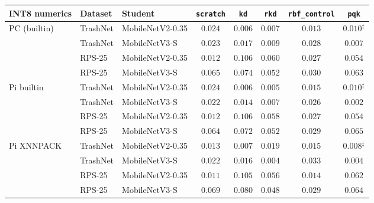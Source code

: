 \begin{tabular}{@{}lllccccc@{}}
\toprule
INT8 numerics & Dataset & Student & \texttt{scratch} & \texttt{kd} & \texttt{rkd} & \texttt{rbf\_control} & \texttt{pqk} \\
\midrule
PC (builtin) & TrashNet & MobileNetV2-0.35 & $0.024$ & $\mathbf{0.006}$ & $0.007$ & $0.013$ & $0.010$$^{\ddagger}$ \\
 & TrashNet & MobileNetV3-S & $0.023$ & $0.017$ & $0.009$ & $0.028$ & $\mathbf{0.007}$ \\
 & RPS-25 & MobileNetV2-0.35 & $\mathbf{0.012}$ & $0.106$ & $0.060$ & $0.027$ & $0.054$ \\
 & RPS-25 & MobileNetV3-S & $0.065$ & $0.074$ & $0.052$ & $\mathbf{0.030}$ & $0.063$ \\
\midrule
Pi builtin & TrashNet & MobileNetV2-0.35 & $0.024$ & $0.006$ & $\mathbf{0.005}$ & $0.015$ & $0.010$$^{\ddagger}$ \\
 & TrashNet & MobileNetV3-S & $0.022$ & $0.014$ & $0.007$ & $0.026$ & $\mathbf{0.002}$ \\
 & RPS-25 & MobileNetV2-0.35 & $\mathbf{0.012}$ & $0.106$ & $0.058$ & $0.027$ & $0.054$ \\
 & RPS-25 & MobileNetV3-S & $0.064$ & $0.072$ & $0.052$ & $\mathbf{0.029}$ & $0.065$ \\
\midrule
Pi XNNPACK & TrashNet & MobileNetV2-0.35 & $0.013$ & $\mathbf{0.007}$ & $0.019$ & $0.015$ & $0.008$$^{\ddagger}$ \\
 & TrashNet & MobileNetV3-S & $0.022$ & $0.016$ & $0.004$ & $0.033$ & $\mathbf{0.004}$ \\
 & RPS-25 & MobileNetV2-0.35 & $\mathbf{0.011}$ & $0.105$ & $0.056$ & $0.014$ & $0.062$ \\
 & RPS-25 & MobileNetV3-S & $0.069$ & $0.080$ & $0.048$ & $\mathbf{0.029}$ & $0.064$ \\
\bottomrule
\end{tabular}
